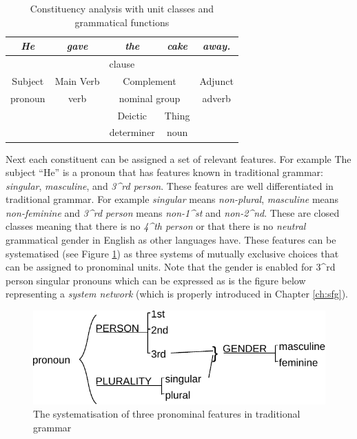 \begin{table}[!ht]
    \centering
    \begin{tabular}{cc|c|c|c}
        \hline
        \multicolumn{1}{|c|}{\textit{He}} & \textit{gave} & \textit{the}     & \textit{cake}   & \multicolumn{1}{c|}{\textit{away.}} \\ \hline
        \multicolumn{5}{|c|}{clause}                                                                                                 \\ \hline
        \multicolumn{1}{|c|}{Subject}     & Main Verb     & \multicolumn{2}{c|}{Complement}    & \multicolumn{1}{c|}{Adjunct}        \\ \hline
        \multicolumn{1}{|c|}{pronoun}      & verb          & \multicolumn{2}{c|}{nominal group} & \multicolumn{1}{c|}{adverb}         \\ \hline
        &               & Deictic          & Thing           &                                     \\ \cline{3-4}
        &               & determiner       & noun            &                                     \\ \cline{3-4}
    \end{tabular}
    \caption{Constituency analysis with unit classes and grammatical functions}
    \label{tab:sfg-constituency-analisys}
\end{table}

Next each constituent can be assigned a set of relevant features. For example The subject ``He'' is a pronoun that has features known in traditional grammar: \textit{singular}, \textit{masculine}, and \textit{3^{rd} person}. These features are well differentiated in traditional grammar. For example \textit{singular} means \textit{non-plural}, \textit{masculine} means \textit{non-feminine} and \textit{3^{rd} person} means \textit{non-1^{st}} and \textit{non-2^{nd}}. These are closed classes meaning that there is no \textit{4^{th} person} or that there is no \textit{neutral} grammatical gender in English as other languages have. These features can be systematised (see Figure \ref{fig:traditional-pronoun}) as three systems of mutually exclusive choices that can be assigned to pronominal units. Note that the gender is enabled for 3^{rd} person singular pronouns which can be expressed as is the figure below representing a \textit{system network} (which is properly introduced in Chapter \ref{ch:sfg}).

\begin{figure}[!ht]
    \centering      
    \includegraphics[width=.56\textwidth]{Figures/Example/traditional-pronoun.pdf}      
    \caption{The systematisation of three pronominal features in traditional grammar}
    \label{fig:traditional-pronoun}
\end{figure}

